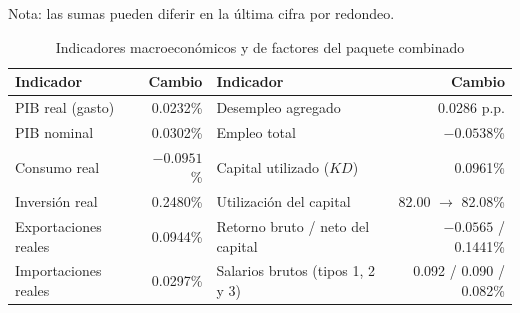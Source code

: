 \documentclass[11pt]{article}
\begin{document}
\begin{table}[H]
\centering
\caption{Recaudación y descomposición del impacto fiscal del paquete combinado (porcentaje y puntos del PIB nominal inicial)}
\label{tab:comb-descomposicion}
\small
{}
\par\smallskip
\begin{minipage}{\textwidth}
\footnotesize Nota: las sumas pueden diferir en la última cifra por redondeo.
\end{minipage}
\end{table}

\begin{table}[H]
\centering
\caption{Indicadores macroeconómicos y de factores del paquete combinado}
\small
\begin{tabular}{|l|r|l|r|}
  \hline
  Indicador & Cambio & Indicador & Cambio \\
  \hline
  PIB real (gasto) & 0.0232\% & Desempleo agregado & 0.0286 p.p. \\
  \hline
  PIB nominal & 0.0302\% & Empleo total & $-0.0538$\% \\
  \hline
  Consumo real & $-0.0951$\% & Capital utilizado ($KD$) & 0.0961\% \\
  \hline
  Inversión real & 0.2480\% & Utilización del capital & 82.00 $\to$ 82.08\% \\
  \hline
  Exportaciones reales & 0.0944\% & Retorno bruto / neto del capital & $-0.0565$ / 0.1441\% \\
  \hline
  Importaciones reales & 0.0297\% & Salarios brutos (tipos 1, 2 y 3) & 0.092 / 0.090 / 0.082\% \\
  \hline
\end{tabular}
\end{table}
\end{document}
